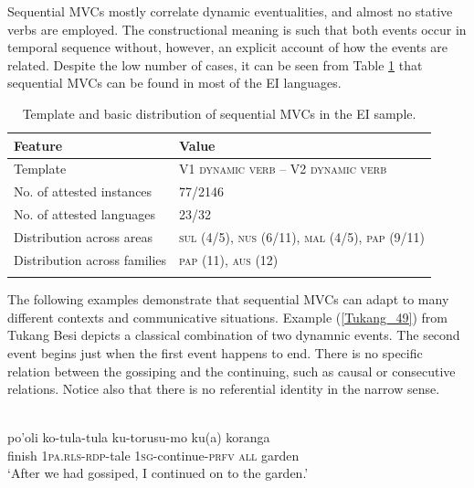 Sequential MVCs mostly correlate dynamic eventualities, and almost no stative verbs are employed. The constructional meaning is such that both events occur in temporal sequence without, however, an explicit account of how the events are related. Despite the low number of cases, it can be seen from Table \ref{table:sequential} that sequential MVCs can be found in most of the EI languages.

\begin{table}
\begin{tabular}{ll}
\lsptoprule
Feature&Value\tabularnewline
\hline
Template& V1 \textsc{dynamic verb} -- V2 \textsc{dynamic verb}\tabularnewline
No. of attested instances& 77/2146 \tabularnewline
No. of attested languages& 23/32 \tabularnewline
Distribution across areas& \textsc{sul} (4/5), \textsc{nus} (6/11), \textsc{mal} (4/5), \textsc{pap} (9/11) \tabularnewline
Distribution across families& \textsc{pap} (11), \textsc{aus} (12) \tabularnewline
\lspbottomrule
\end{tabular}
\caption[Template and basic distribution of sequential MVCs]{Template and basic distribution of sequential MVCs in the EI sample.}
\label{table:sequential}
\end{table}

The following examples demonstrate that sequential MVCs can adapt to many different contexts and communicative situations. Example (\ref{Tukang_49}) from Tukang Besi depicts a classical combination of two dynamnic events. The second event begins just when the first event happens to end. There is no specific relation between the gossiping and the continuing, such as causal or consecutive relations. Notice also that there is no referential identity in the narrow sense. 

\ea \label{Tukang_49}
\\
\gll po'oli ko-tula-tula ku-torusu-mo ku(a) koranga \\
finish 1\textsc{pa}.\textsc{rls}-\textsc{rdp}-tale 1\textsc{sg}-continue-\textsc{prfv} \textsc{all} garden \\
\glft `After we had gossiped, I continued on to the garden.'\\ 
\z

